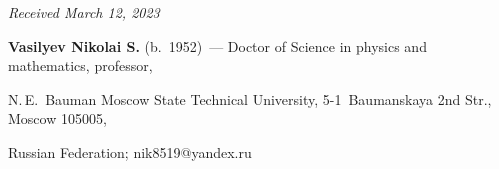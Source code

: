 \vspace*{-6pt}



\hfill{\small\textit{Received March 12, 2023}} 



\Contrl



\noindent

\textbf{Vasilyev Nikolai S.} (b.\ 1952)~--- Doctor of Science in physics and mathematics, professor, 

N.\,E.~Bauman Moscow State Technical University, 5-1~Baumanskaya 2nd Str., Moscow 105005, 

Russian Federation; \mbox{nik8519@yandex.ru}

     







\label{end\stat}



\renewcommand{\bibname}{\protect\rm Литература} 

